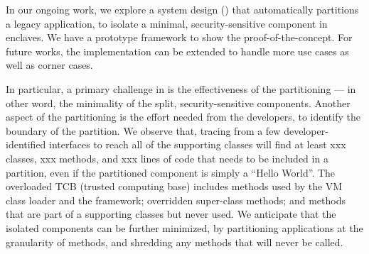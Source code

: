 %


In our ongoing work,
we explore a system design (\term{\civet{}}) that automatically partitions a legacy \java{} application,
to isolate a minimal, security-sensitive component
in \intel{} \sgx{} enclaves.
We have a prototype framework to show the proof-of-the-concept.
For future works,
the implementation can be extended to handle more use cases as well as corner cases.

In particular, a primary challenge in \civet{} is
the effectiveness of the partitioning
--- in other word, the minimality of the split, security-sensitive components.
Another aspect of the partitioning is the effort needed from the developers,
to identify the boundary of the partition.
We observe that, tracing from
a few developer-identified interfaces to reach all of the supporting classes
will find at least xxx classes, xxx methods,
and xxx lines of code 
that needs to be included in a partition,
even if the partitioned component
is simply a ``Hello World''.
The overloaded TCB (trusted computing base) includes
methods used by the 
\java{} VM class loader and the \civet{} framework;
overridden super-class methods;
and methods that are part of a supporting classes
but never used.
We anticipate that the isolated components
can be further minimized,
by partitioning applications at the granularity of methods,
and shredding any methods that will never be called.

